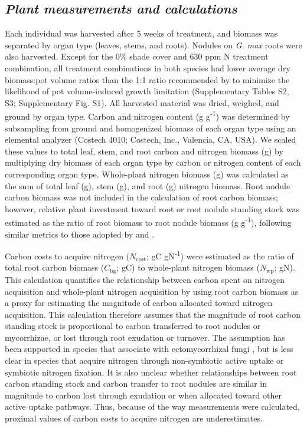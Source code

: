 \subsection{\textit{Plant measurements and calculations}}
Each individual was harvested after 5 weeks of treatment, and biomass was separated by organ type (leaves, stems, and roots). Nodules on \textit{G. max} roots were also harvested. Except for the 0\% shade cover and 630 ppm N treatment combination, all treatment combinations in both species had lower average dry biomass:pot volume ratios than the 1:1 ratio recommended by  to minimize the likelihood of pot volume-induced growth limitation (Supplementary Tables S2, S3; Supplementary Fig. S1). All harvested material was dried, weighed, and ground by organ type. Carbon and nitrogen content (g g\textsuperscript{-1}) was determined by subsampling from ground and homogenized biomass of each organ type using an elemental analyzer (Costech 4010; Costech, Inc., Valencia, CA, USA). We scaled these values to total leaf, stem, and root carbon and nitrogen biomass (g) by multiplying dry biomass of each organ type by carbon or nitrogen content of each corresponding organ type. Whole-plant nitrogen biomass (g) was calculated as the sum of total leaf (g), stem (g), and root (g) nitrogen biomass. Root nodule carbon biomass was not included in the calculation of root carbon biomass; however, relative plant investment toward root or root nodule standing stock was estimated as the ratio of root biomass to root nodule biomass (g g\textsuperscript{-1}), following similar metrics to those adopted by  and .

Carbon costs to acquire nitrogen ($N_\mathrm{cost}$; gC gN\textsuperscript{-1}) were estimated as the ratio of total root carbon biomass ($C_\mathrm{bg}$; gC) to whole-plant nitrogen biomass ($N_\mathrm{wp}$; gN). This calculation quantifies the relationship between carbon spent on nitrogen acquisition and whole-plant nitrogen acquisition by using root carbon biomass as a proxy for estimating the magnitude of carbon allocated toward nitrogen acquisition. This calculation therefore assumes that the magnitude of root carbon standing stock is proportional to carbon transferred to root nodules or mycorrhizae, or lost through root exudation or turnover. The assumption has been supported in species that associate with ectomycorrhizal fungi , but is less clear in species that acquire nitrogen through non-symbiotic active uptake or symbiotic nitrogen fixation. It is also unclear whether relationships between root carbon standing stock and carbon transfer to root nodules are similar in magnitude to carbon lost through exudation or when allocated toward other active uptake pathways. Thus, because of the way measurements were calculated, proximal values of carbon costs to acquire nitrogen are underestimates.

